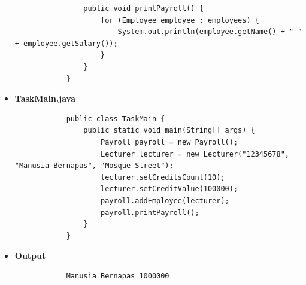 \documentclass[12pt,titlepage]{article}
\begin{document}
\begin{itemize}
{\begin{verbatim}
                public void printPayroll() {
                    for (Employee employee : employees) {
                        System.out.println(employee.getName() + " " + employee.getSalary());
                    }
                }
            }
        \end{verbatim}
    }
    \item {
        \textbf{TaskMain.java}
        \begin{verbatim}
            public class TaskMain {
                public static void main(String[] args) {
                    Payroll payroll = new Payroll();
                    Lecturer lecturer = new Lecturer("12345678", "Manusia Bernapas", "Mosque Street");
                    lecturer.setCreditsCount(10);
                    lecturer.setCreditValue(100000);
                    payroll.addEmployee(lecturer);
                    payroll.printPayroll();
                }
            }
        \end{verbatim}
    }
    \item {
        \textbf{Output}
        \begin{verbatim}
            Manusia Bernapas 1000000
        \end{verbatim}
    }
\end{itemize}
\end{document}
